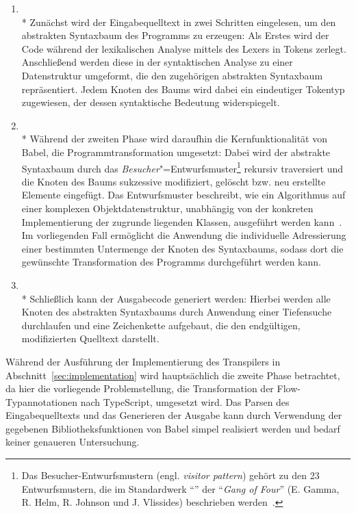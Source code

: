 \begin{enumerate}
  \item {}\\*
    Zunächst wird der Eingabequelltext in zwei Schritten eingelesen, um den abstrakten Syntaxbaum des Programms zu erzeugen: Als Erstes wird der Code während der lexikalischen Analyse mittels des Lexers in Tokens zerlegt. Anschließend werden diese in der syntaktischen Analyse zu einer Datenstruktur umgeformt, die den zugehörigen abstrakten Syntaxbaum repräsentiert. Jedem Knoten des Baums wird dabei ein eindeutiger Tokentyp zugewiesen, der dessen syntaktische Bedeutung widerspiegelt.
    \bigbreak
  \item {}\\*
    Während der zweiten Phase wird daraufhin die Kernfunktionalität von Babel, die Programmtransformation umgesetzt: Dabei wird der abstrakte Syntaxbaum durch das \emph{Besucher}"=Entwurfsmuster\footnote{Das Besucher-Entwurfsmustern (engl. \textit{visitor pattern}) gehört zu den 23 Entwurfsmustern, die im Standardwerk \enquote{} der \enquote{\textit{Gang of Four}} (E. Gamma, R. Helm, R. Johnson und J. Vlissides) beschrieben werden~\autocite[306\psqq]{GAMMA:1994}.} rekursiv traversiert und die Knoten des Baums sukzessive modifiziert, gelöscht bzw. neu erstellte Elemente eingefügt. Das Entwurfsmuster beschreibt, wie ein Algorithmus auf einer komplexen Objektdatenstruktur, unabhängig von der konkreten Implementierung der zugrunde liegenden Klassen, ausgeführt werden kann~\autocite[634\psq]{FREEMAN:2004}. Im vorliegenden Fall ermöglicht die Anwendung die individuelle Adressierung einer bestimmten Untermenge der Knoten des Syntaxbaums, sodass dort die gewünschte Transformation des Programms durchgeführt werden kann.
    \bigbreak
  \item {}\\*
    Schließlich kann der Ausgabecode generiert werden: Hierbei werden alle Knoten des abstrakten Syntaxbaums durch Anwendung einer Tiefensuche durchlaufen und eine Zeichenkette aufgebaut, die den endgültigen, modifizierten Quelltext darstellt.
\end{enumerate}

Während der Ausführung der Implementierung des Transpilers in Abschnitt~\ref{sec:implementation} wird hauptsächlich die zweite Phase betrachtet, da hier die vorliegende Problemstellung, die Transformation der Flow-Typannotationen nach TypeScript, umgesetzt wird. Das Parsen des Eingabequelltexts und das Generieren der Ausgabe kann durch Verwendung der gegebenen Bibliotheksfunktionen von Babel simpel realisiert werden und bedarf keiner genaueren Untersuchung.

